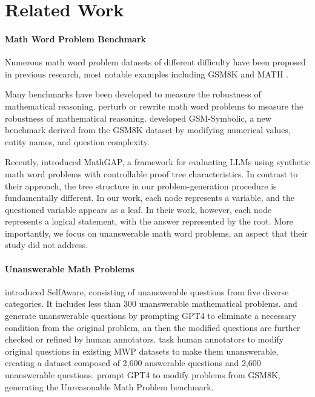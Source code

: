 \section{Related Work}
\paragraph{Math Word Problem Benchmark}
Numerous math word problem datasets of different difficulty have been proposed in previous research, most notable examples including GSM8K \citep{cobbe2021training} and MATH \citep{hendrycks2021measuring}.

Many benchmarks have been developed to measure the robustness of mathematical reasoning. \citep{li2024gsm, zhou2024mathattack, yu2023metamath, shi2023large} perturb or rewrite math word problems to measure the robustness of mathematical reasoning. \citet{mirzadeh2024gsm} developed GSM-Symbolic, a new benchmark derived from the GSM8K dataset by modifying numerical values, entity names, and question complexity. 

Recently, \citet{opedal2024mathgap} introduced MathGAP, a framework for evaluating LLMs using synthetic math word problems
with controllable proof tree characteristics. 
In contrast to their approach, the tree structure in our problem-generation procedure is fundamentally different. In our work, each node represents a variable, and the questioned variable appears as a leaf. In their work, however, each node represents a logical statement, with the answer represented by the root. More importantly, we focus on unanswerable math word problems, an aspect that their study did not address.

\paragraph{Unanswerable Math Problems}

\citet{yin2023large} introduced SelfAware, consisting
of unanswerable questions from five diverse categories. It includes less than 300 unanswerable mathematical problems. \citet{li2024gsm} and \citet{zhou2024your} generate unanswerable questions by prompting GPT4 to eliminate a necessary condition from the original problem, an then the modified questions are further checked or refined by human annotators.
\citet{sun2024benchmarking} task human annotators to modify original questions in existing MWP datasets to make them unanswerable, creating a dataset composed of 2,600 answerable questions and 2,600 unanswerable questions. \citet{ma2024large} prompt GPT4 to modify problems from GSM8K, generating the Unreasonable Math Problem benchmark. 

